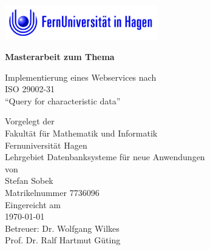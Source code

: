 \begin{titlepage}
\vspace{4em}
\begin{center}
	\includegraphics[width=0.50\textwidth]{images/feulogo.jpg}
\end{center}
\center

 \Large{\textsf{\textbf{Masterarbeit zum Thema}}}
 \vspace{1em}

\Huge{\textsf{Implementierung eines Webservices nach \\ ISO 29002-31 \\  \enquote{Query for characteristic data}}}
\vspace{1em}
\\


\vspace{1em}

{\normalsize 
\textsf{
Vorgelegt der\\
Fakultät für Mathematik und Informatik\\Fernuniversität Hagen\\Lehrgebiet Datenbanksysteme für neue Anwendungen
}
}
\vspace{2em}
\\

\normalsize{
	\textsf{
	von \\
Stefan Sobek \\ 
Matrikelnummer 7736096 \\
\vspace{2em}
Eingereicht am \\  
\today
\vspace{3em}
\\
Betreuer: Dr. Wolfgang Wilkes\\
Prof. Dr. Ralf Hartmut Güting \\
}
}
\end{titlepage}
